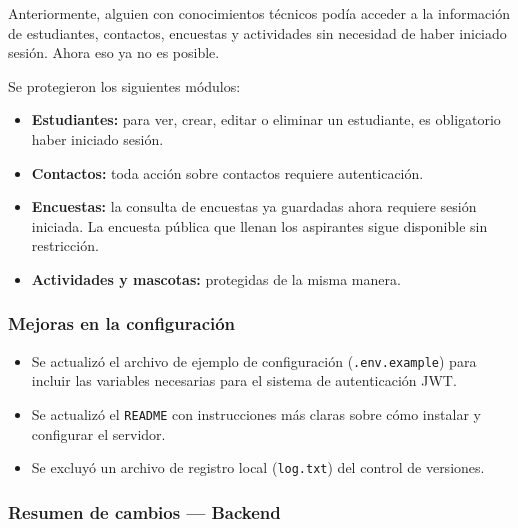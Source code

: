 \documentclass[
]{article}
\providecommand{\tightlist}{%
  \setlength{\itemsep}{0pt}\setlength{\parskip}{0pt}}
\begin{document}
Anteriormente, alguien con conocimientos técnicos podía acceder a la
información de estudiantes, contactos, encuestas y actividades sin
necesidad de haber iniciado sesión. Ahora eso ya no es posible.

Se protegieron los siguientes módulos:

\begin{itemize}
\tightlist
\item
  \textbf{Estudiantes:} para ver, crear, editar o eliminar un
  estudiante, es obligatorio haber iniciado sesión.
\item
  \textbf{Contactos:} toda acción sobre contactos requiere
  autenticación.
\item
  \textbf{Encuestas:} la consulta de encuestas ya guardadas ahora
  requiere sesión iniciada. La encuesta pública que llenan los
  aspirantes sigue disponible sin restricción.
\item
  \textbf{Actividades y mascotas:} protegidas de la misma manera.
\end{itemize}

\subsubsection{Mejoras en la
configuración}\label{mejoras-en-la-configuraciuxf3n}

\begin{itemize}
\tightlist
\item
  Se actualizó el archivo de ejemplo de configuración
  (\texttt{.env.example}) para incluir las variables necesarias para el
  sistema de autenticación JWT.
\item
  Se actualizó el \texttt{README} con instrucciones más claras sobre
  cómo instalar y configurar el servidor.
\item
  Se excluyó un archivo de registro local (\texttt{log.txt}) del control
  de versiones.
\end{itemize}

\subsubsection{Resumen de cambios ---
Backend}\label{resumen-de-cambios-backend}
\end{document}
